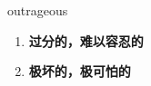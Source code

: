 
\begin{frame}
{\huge outrageous}
\begin{center}
\begin{enumerate}\Large
  \item \textbf{过分的，难以容忍的}
  \item \textbf{极坏的，极可怕的}
\end{enumerate}
\end{center}
\end{frame}
